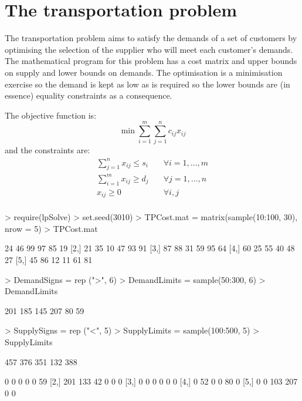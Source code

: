 \section{The transportation problem}

The transportation problem aims to satisfy the demands of a set of customers by optimising the selection of the supplier who will meet each customer's demands. The mathematical program for this problem has a cost matrix and upper bounds on supply and lower bounds on demands. The optimisation is a minimisation exercise so the demand is kept as low as is required so the lower bounds are (in essence) equality constraints as a consequence.

The objective function is:\begin{equation}\label{OperResTransObj}
\min{ \sum_{i=1}^m{ \sum_{j=1}^n{
c_{ij}x_{ij}
}}}\end{equation}
and the constraints are:
\begin{eqnarray*} \sum_{j=1}^n { x_{ij}} \le s_i& \quad \forall i=1,\ldots,m\\
\sum_{i=1}^m { x_{ij}} \ge d_j& \quad \forall j=1,\ldots,n\\
x_{ij} \ge 0& \quad \forall i,j\\
\end{eqnarray*} 

\begin{Schunk}
\begin{Sinput}
> require(lpSolve)
> set.seed(3010)
> TPCost.mat = matrix(sample(10:100, 30), nrow = 5)
> TPCost.mat
\end{Sinput}
\begin{Soutput}
     [,1] [,2] [,3] [,4] [,5] [,6]
[1,]   24   46   99   97   85   19
[2,]   21   35   10   47   93   91
[3,]   87   88   31   59   95   64
[4,]   60   25   55   40   48   27
[5,]   45   86   12   11   61   81
\end{Soutput}
\begin{Sinput}
> DemandSigns = rep (">", 6)
> DemandLimits = sample(50:300, 6)
> DemandLimits
\end{Sinput}
\begin{Soutput}
[1] 201 185 145 207  80  59
\end{Soutput}
\begin{Sinput}
> SupplySigns = rep ("<", 5)
> SupplyLimits = sample(100:500, 5)
> SupplyLimits
\end{Sinput}
\begin{Soutput}
[1] 457 376 351 132 388
\end{Soutput}
\begin{Soutput}
     [,1] [,2] [,3] [,4] [,5] [,6]
[1,]    0    0    0    0    0   59
[2,]  201  133   42    0    0    0
[3,]    0    0    0    0    0    0
[4,]    0   52    0    0   80    0
[5,]    0    0  103  207    0    0
\end{Soutput}
\end{Schunk}




